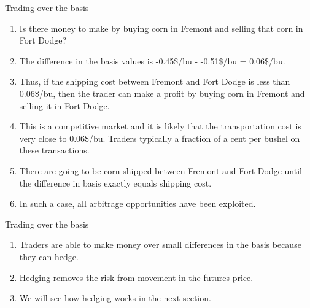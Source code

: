 \documentclass[table,xcolor=pdftex,dvipsnames]{beamer}\usepackage[]{graphicx}\usepackage[]{color}
\begin{document}
\begin{frame}{Trading over the basis}
\begin{enumerate}[label=\textbullet]
    \item Is there money to make by buying corn in Fremont and selling that corn in Fort Dodge?
    \item The difference in the basis values is -0.45\$/bu - -0.51\$/bu = 0.06\$/bu.
    \item Thus, if the shipping cost between Fremont and Fort Dodge is less than 0.06\$/bu, then the trader can make a profit by buying corn in Fremont and selling it in Fort Dodge.
    \item This is a competitive market and it is likely that the transportation cost is very close to 0.06\$/bu. Traders typically a fraction of a cent per bushel on these transactions.
    \item There are going to be corn shipped between Fremont and Fort Dodge until the difference in basis exactly equals shipping cost.
    \item In such a case, all arbitrage opportunities have been exploited.
\end{enumerate}
\end{frame}



\begin{frame}{Trading over the basis}
\begin{enumerate}[label=\textbullet]
    \item Traders are able to make money over small differences in the basis because they can hedge.
    \item Hedging removes the risk from movement in the futures price. 
    \item We will see how hedging works in the next section.
\end{enumerate}
\end{frame}



\end{document}
